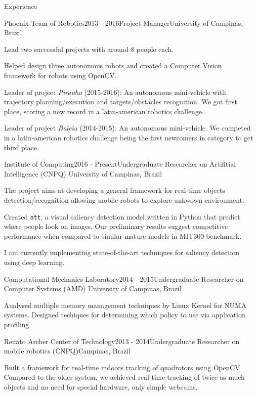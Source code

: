 \documentclass[8pt]{resume}
\newcommand{\tit}[1]{\textit{#1}}
\newcommand{\ttt}[1]{\texttt{#1}}
\begin{document}
\begin{rSection}{Experience}

\begin{rSubsection}{Phoenix Team of Robotics}{2013 - 2016}{Project Manager}{University of Campinas, Brazil}
    \item Lead two successful projects with around 8 people each.
    \item Helped design three autonomous robots and
        created a Computer Vision framework for robots using OpenCV.
    \item Leader of project \tit{Piranha} (2015-2016):
        An autonomous mini-vehicle with trajectory planning/execution
        and targets/obstacles recognition.
        We got first place, scoring a new record in a latin-american
        robotics challenge.
    \item Leader of project \tit{Baleia} (2014-2015):
        An autonomous mini-vehicle.
        We competed in a latin-american robotics challenge
        being the first newcomers in category to get third place.
\end{rSubsection}

\begin{rSubsection}{Institute of Computing}{2016 - Present}{Undergraduate Researcher on Artifitial Intelligence (CNPQ)}
    {University of Campinas, Brazil}
    \item The project aims at developing a general framework for real-time
        objects detection/recognition allowing mobile robots to explore
        unkwown environment.
    \item Created \ttt{att}, a visual saliency detection model written in
        Python that predict where people look on images.
        Our preliminary results suggest competitive performance when compared
        to similar mature models in MIT300 benchmark.
    \item I am currently implementing state-of-the-art techniques for
        saliency detection using deep learning.
\end{rSubsection}

\begin{rSubsection}{Computational Mechanics Laboratory}{2014 - 2015}{Undergraduate Researcher on Computer Systems (AMD)}
    {University of Campinas, Brazil}
    \item Analysed multiple memory management techniques by Linux Kernel
        for NUMA systems. Designed techiques for determining which policy
        to use via application profiling.
\end{rSubsection}

\begin{rSubsection}{Renato Archer Center of Technology}{2013 - 2014}{Undergraduate Researcher on mobile robotics (CNPQ)}{Campinas, Brazil}
    \item Built a framework for real-time indoors tracking of
        quadrotors using OpenCV\@. Compared to the older system,
        we achieved real-time tracking of twice as much objects
        and no need for special hardware, only simple webcams.
\end{rSubsection}

\end{rSection}
\end{document}
